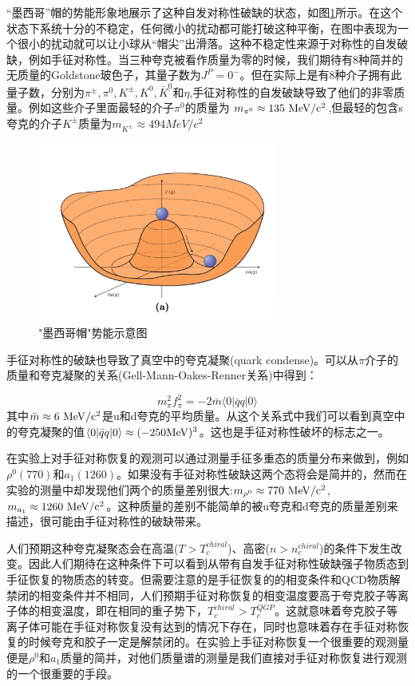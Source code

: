 “墨西哥”帽的势能形象地展示了这种自发对称性破缺的状态，如图\ref{fig:MexHat}所示。在这个状态下系统十分的不稳定，任何微小的扰动都可能打破这种平衡，在图中表现为一个很小的扰动就可以让小球从“帽尖”出滑落。这种不稳定性来源于对称性的自发破缺，例如手征对称性。当三种夸克被看作质量为零的时候，我们期待有8种简并的无质量的Goldstone玻色子，其量子数为$J^P = 0^-$。但在实际上是有8种介子拥有此量子数，分别为$\pi^{\pm},\pi^0,K^{\pm},K^0,\bar{K}^0$和$\eta$,手征对称性的自发破缺导致了他们的非零质量。例如这些介子里面最轻的介子$\pi^0$的质量为 $m_{\pi^0} \approx 135~{\rm MeV/c^2}$,但最轻的包含s夸克的介子$K^{\pm}$质量为$m_{K^{\pm}} \approx 494 MeV/c^2$

\begin{figure}[htb]
    \begin{center}
    \includegraphics[width=0.7\textwidth,clip]{figures/Chapter1/MexHat.png}
    \end{center}
    \caption["墨西哥帽"势能示意图]{"墨西哥帽"势能示意图}
    \label{fig:MexHat}
\end{figure}

手征对称性的破缺也导致了真空中的夸克凝聚(quark condense)。可以从$\pi$介子的质量和夸克凝聚的关系(Gell-Mann-Oakes-Renner关系)中得到：

\begin{equation}
    m_{\pi}^2 f_{\pi}^2 = -2\bar{m}\langle 0|\bar{q}q|0 \rangle
\end{equation}
其中$\bar{m} \approx 6~ {\rm MeV/c^2} $是u和d夸克的平均质量。从这个关系式中我们可以看到真空中的夸克凝聚的值$\langle 0|\bar{q}q|0 \rangle \approx (-250 {\rm MeV})^3$。这也是手征对称性破坏的标志之一。

在实验上对手征对称恢复的观测可以通过测量手征多重态的质量分布来做到，例如$\rho^0(770)$和$a_1(1260)$。如果没有手征对称性破缺这两个态将会是简并的，然而在实验的测量中却发现他们两个的质量差别很大:$m_{\rho^0} \approx 770 ~{\rm MeV/c^2}$,$m_{a_1} \approx 1260 ~{\rm MeV/c^2}$。这种质量的差别不能简单的被u夸克和d夸克的质量差别来描述，很可能由手征对称性的破缺带来。

人们预期这种夸克凝聚态会在高温($T > T_c^{chiral}$)、高密($n > n_c^{chiral}$)的条件下发生改变。因此人们期待在这种条件下可以看到从带有自发手征对称性破缺强子物质态到手征恢复的物质态的转变。但需要注意的是手征恢复的的相变条件和QCD物质解禁闭的相变条件并不相同，人们预期手征对称恢复的相变温度要高于夸克胶子等离子体的相变温度，即在相同的重子势下，$T_c^{chiral} > T_c^{QGP}$。这就意味着夸克胶子等离子体可能在手征对称恢复没有达到的情况下存在，同时也意味着存在手征对称恢复的时候夸克和胶子一定是解禁闭的。在实验上手征对称恢复一个很重要的观测量便是$\rho^0$和$a_1$质量的简并，对他们质量谱的测量是我们直接对手征对称恢复进行观测的一个很重要的手段。
